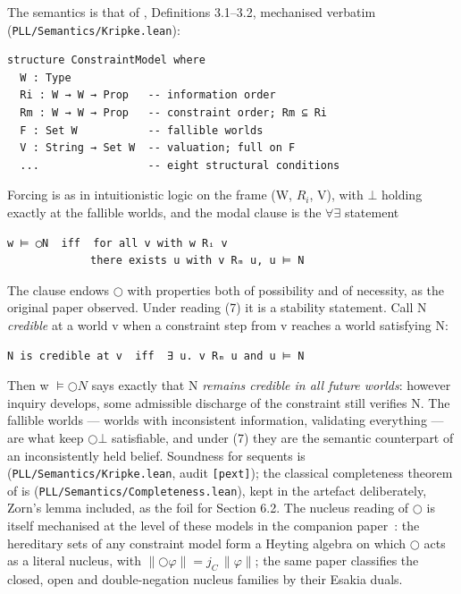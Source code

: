 The semantics is that of \cite{FairtloughMendler1997}, Definitions 3.1--3.2, mechanised
verbatim (\texttt{PLL/\allowbreak{}Semantics/\allowbreak{}Kripke.lean}):

\begin{lstlisting}
structure ConstraintModel where
  W : Type
  Ri : W → W → Prop   -- information order
  Rm : W → W → Prop   -- constraint order; Rm ⊆ Ri
  F : Set W           -- fallible worlds
  V : String → Set W  -- valuation; full on F
  ...                 -- eight structural conditions
\end{lstlisting}

Forcing is as in intuitionistic logic on the frame (W, \ensuremath{R_{i}}, V), with
\ensuremath{\bot} holding exactly at the fallible worlds, and the modal clause is
the \ensuremath{\forall\exists} statement

\begin{lstlisting}
w ⊨ ◯N  iff  for all v with w Rᵢ v
             there exists u with v Rₘ u, u ⊨ N
\end{lstlisting}

The clause endows \ensuremath{\bigcirc} with properties both of possibility and of
necessity, as the original paper observed. Under reading (7) it is a
stability statement. Call N \emph{credible} at a world v when a
constraint step from v reaches a world satisfying N:

\begin{lstlisting}
N is credible at v  iff  ∃ u. v Rₘ u and u ⊨ N
\end{lstlisting}

Then w \ensuremath{\vDash \bigcirc N} says exactly that N \emph{remains credible in all
future worlds}: however inquiry develops, some admissible discharge of
the constraint still verifies N. The
fallible worlds --- worlds with inconsistent information, validating
everything --- are what keep \ensuremath{\bigcirc\bot} satisfiable, and under (7) they are
the semantic counterpart of an inconsistently held belief. Soundness for sequents is
 (\texttt{PLL/\allowbreak{}Semantics/\allowbreak{}Kripke.lean}, audit \texttt{[pext]}); the classical
completeness theorem of \cite[\S4]{FairtloughMendler1997} is 
(\texttt{PLL/\allowbreak{}Semantics/\allowbreak{}Completeness.lean}), kept in the artefact deliberately, Zorn's
lemma included, as the foil for Section 6.2.
The nucleus reading of \ensuremath{\bigcirc} is itself mechanised at the
level of these models in the companion paper~\cite{SemPaper}: the
hereditary sets of any constraint model form a Heyting algebra on
which \ensuremath{\bigcirc} acts as a literal nucleus, with
\ensuremath{\lVert \bigcirc\varphi \rVert = j_{C}\,\lVert \varphi \rVert};
the same paper classifies the closed, open and double-negation nucleus
families by their Esakia duals.

